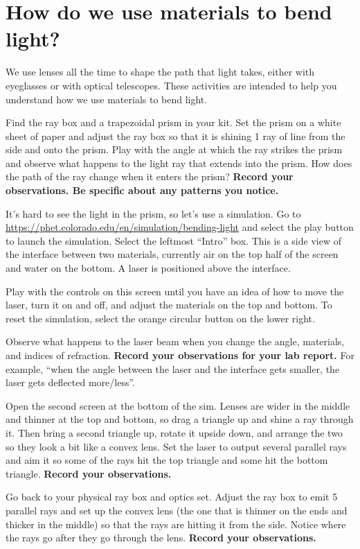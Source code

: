 \section{How do we use materials to bend light?}

We use lenses all the time to shape the path that light takes, either with eyeglasses or with optical telescopes. These activities are intended to help you understand how we use materials to bend light.

\begin{steps}
	\item Find the ray box and a trapezoidal prism in your kit. Set the prism on a white sheet of paper and adjust the ray box so that it is shining 1 ray of line from the side and onto the prism. Play with the angle at which the ray strikes the prism and observe what happens to the light ray that extends into the prism. How does the path of the ray change when it enters the prism? \textbf{Record your observations. Be specific about any patterns you notice.}
	
	\item It's hard to see the light in the prism, so let's use a simulation. Go to \url{https://phet.colorado.edu/en/simulation/bending-light} and select the play button to launch the simulation. Select the leftmost ``Intro'' box. This is a side view of the interface between two materials, currently air on the top half of the screen and water on the bottom. A laser is positioned above the interface.
	
	\item Play with the controls on this screen until you have an idea of how to move the laser, turn it on and off, and adjust the materials on the top and bottom. To reset the simulation, select the orange circular button on the lower right.
	
	\item Observe what happens to the laser beam when you change the angle, materials, and indices of refraction. \textbf{Record your observations for your lab report.} For example, ``when the angle between the laser and the interface gets smaller, the laser gets deflected more/less''.

	\item Open the second screen at the bottom of the sim. Lenses are wider in the middle and thinner at the top and bottom, so drag a triangle up and shine a ray through it. Then bring a second triangle up, rotate it upside down, and arrange the two so they look a bit like a convex lens. Set the laser to output several parallel rays and aim it so some of the rays hit the top triangle and some hit the bottom triangle. \textbf{Record your observations.}
	
	\item Go back to your physical ray box and optics set. Adjust the ray box to emit 5 parallel rays and set up the convex lens (the one that is thinner on the ends and thicker in the middle) so that the rays are hitting it from the side. Notice where the rays go after they go through the lens. \textbf{Record your observations.}
\end{steps}

